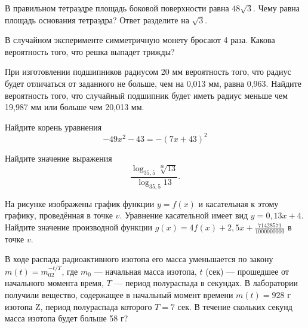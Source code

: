 \documentclass[twocolumn]{article}
\begin{document}
\begin{taskBN}{2}
В правильном тетраэдре площадь боковой поверхности равна $48\sqrt{3}$. Чему равна площадь основания тетраэдра? Ответ разделите на $\sqrt{3}$.\vspace{2.5cm}
\end{taskBN}

\begin{taskBN}{3}
В случайном эксперименте симметричную монету бросают 4 раза. Какова вероятность того, что решка выпадет трижды?
\end{taskBN}

\begin{taskBN}{4}
При изготовлении подшипников радиусом 20 мм вероятность того, что радиус будет отличаться от заданного не больше, чем на 0,013 мм, равна 0,963. Найдите вероятность того, что случайный подшипник будет иметь радиус меньше чем 19,987 мм или больше чем 20,013 мм.
\end{taskBN}

\begin{taskBN}{5}
Найдите корень уравнения $$-49x^2-43=-(7x+43)^2$$
\end{taskBN}

\begin{taskBN}{6}
Найдите значение выражения $$\frac{\log_{35,5}\sqrt[20]{13}}{\log_{35,5}{13}}.$$
\end{taskBN}

\begin{taskBN}{7}
На рисунке изображены график функции $y=f(x)$ и касательная к этому графику, проведённая в точке $v$. Уравнение касательной имеет вид $y= 0{,}13  x+ 4 $. Найдите значение производной функции $g(x) =  4 f(x)+ 2{,}5 x+\frac{71428571}{1000000000}$ в точке $v$.\vspace{2.5cm}
\end{taskBN}

\begin{taskBN}{8}
В ходе распада радиоактивного изотопа его масса уменьшается по закону $m(t) = m_02^{-t/T}$, где $m_0$ — начальная масса изотопа, $t$ (сек) — прошедшее от начального момента время, $T$ — период полураспада в секундах. В лаборатории получили вещество, содержащее в начальный момент времени $m (t) = 928$ г изотопа Z, период полураспада которого $T = 7$ сек. В течение скольких секунд масса изотопа будет больше 58 г?
\end{taskBN}
\end{document}
